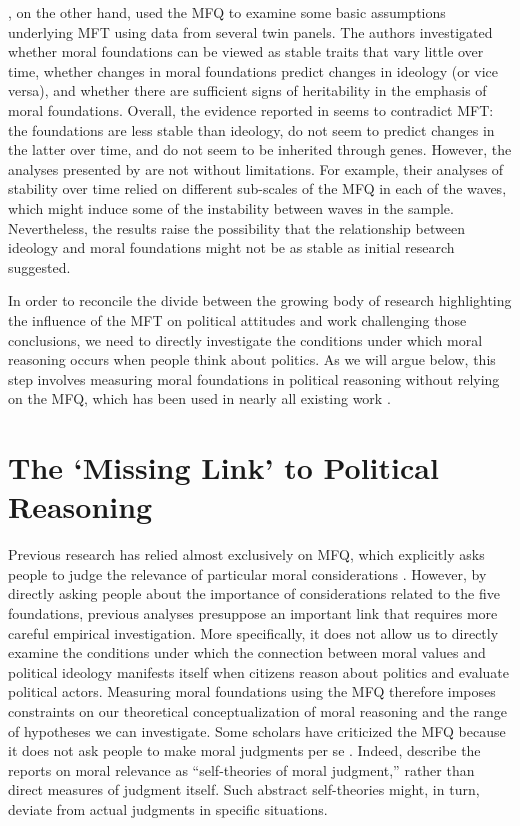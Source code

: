 \documentclass[12pt]{article}
\begin{document}
\citet{smith2016intuitive}, on the other hand, used the MFQ to examine some basic assumptions underlying MFT using data from several twin panels. The authors investigated whether moral foundations can be viewed as stable traits that vary little over time, whether changes in moral foundations predict changes in ideology (or vice versa), and whether there are sufficient signs of heritability in the emphasis of moral foundations. Overall, the evidence reported in \citet{smith2016intuitive} seems to contradict MFT: the foundations are less stable than ideology, do not seem to predict changes in the latter over time, and do not seem to be inherited through genes. However, the analyses presented by \citet{smith2016intuitive} are not without limitations. For example, their analyses of stability over time relied on different sub-scales of the MFQ in each of the waves, which might induce some of the instability between waves in the sample. Nevertheless, the results raise the possibility that the relationship between ideology and moral foundations might not be as stable as initial research suggested.

In order to reconcile the divide between the growing body of research highlighting the influence of the MFT on political attitudes and work challenging those conclusions, we need to directly investigate the conditions under which moral reasoning occurs when people think about politics. As we will argue below, this step involves measuring moral foundations in political reasoning without relying on the MFQ, which has been used in nearly all existing work \citep[but see][]{clifford2014linking}.


\section*{The `Missing Link' to Political Reasoning}

Previous research has relied almost exclusively on MFQ, which explicitly asks people to judge the relevance of particular moral considerations \citep[e.g.][]{graham2011mapping}. However, by directly asking people about the importance of considerations related to the five foundations, previous analyses presuppose an important link that requires more careful empirical investigation. More specifically, it does not allow us to directly examine the conditions under which the connection between moral values and political ideology manifests itself when citizens reason about politics and evaluate political actors. Measuring moral foundations using the MFQ therefore imposes constraints on our theoretical conceptualization of moral reasoning and the range of hypotheses we can investigate. Some scholars have criticized the MFQ because it does not ask people to make moral judgments per se \citep[e.g.][]{clifford2015moral}. Indeed, \citet[1031]{graham2009liberals} describe the reports on moral relevance as ``self-theories of moral judgment,'' rather than direct measures of judgment itself. Such abstract self-theories might, in turn, deviate from actual judgments in specific situations.
\end{document}
